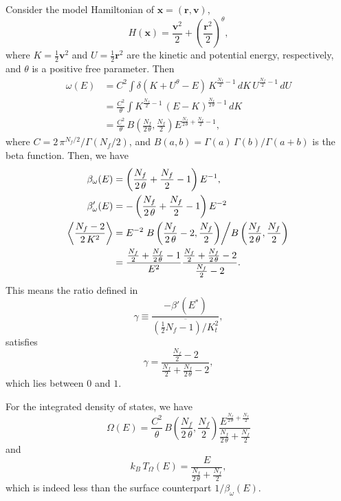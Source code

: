 \documentclass[preprint]{revtex4-1}
\begin{document}
%
Consider the model Hamiltonian of $\mathbf x = (\mathbf r, \mathbf v)$,
\begin{equation}
  H(\mathbf x)
  =
  \frac{\mathbf v^2} { 2 }
  +
  \left( \frac{\mathbf r^2} { 2 } \right)^\theta
  ,
\end{equation}
%
where $K = \frac 1 2 {\mathbf v}^2$ and
$U = \frac 1 2 {\mathbf r}^2$
are the kinetic and potential energy, respectively,
and $\theta$ is a positive free parameter.
Then
\begin{align*}
  \omega(E)
  &=
  C^2
  \int
    \delta\left( K + U^\theta - E \right) \,
    K^{\frac{ N_f } 2 - 1} \, dK \, U^{\frac{ N_f } 2 - 1} \, dU
  \\
  &=
  \frac{ C^2 } { \theta }
  \int
  K^{\frac{ N_f } 2 - 1} \, (E - K)^{\frac{ N_f }{ 2 \, \theta } - 1}
    \, dK
  \\
  &=
  \frac{ C^2 }{ \theta } \,
  B\left( \frac{ N_f } {2 \, \theta}, \frac{ N_f } 2 \right)
  E^{ \frac{ N_f }{2 \, \theta} + \frac{N_f}{2} - 1 }
  ,
\end{align*}
where
%
$C = 2 \, \pi^{N_f/2} / \Gamma\left( N_f / 2 \right)$,
and
$B(a, b) = \Gamma(a) \, \Gamma(b) / \Gamma(a+b)$
is the beta function.
%
Then, we have
\begin{align*}
\beta_\omega(E)
&=
\left(
  \frac{ N_f } { 2 \, \theta } + \frac{ N_f } 2 - 1
\right)
E^{-1}
,
\\
\beta'_\omega(E)
&=
-
\left(
  \frac{ N_f } { 2 \, \theta } + \frac{ N_f } 2 - 1
\right)
E^{-2}
\\
\left\langle
  \frac{
    N_f - 2
  }
  {
    2 \, K^2
  }
\right\rangle
&=
  E^{-2}
\left.
  B\left( \frac{ N_f } { 2  \, \theta } - 2, \frac{ N_f } { 2 } \right)
\middle/
  B\left( \frac{ N_f } { 2  \, \theta }, \frac{ N_f } { 2 } \right)
\right.
\\
&=
\frac{ \frac{ N_f } 2 + \frac{ N_f }{2 \, \theta} - 1 }
     { E^2 }
\frac{ \frac{ N_f } 2 + \frac{ N_f }{2 \, \theta} - 2 }
     { \frac{ N_f } 2 - 2 }
.
\end{align*}
This means the ratio defined in
\begin{equation}
  \gamma
  \equiv
  \frac
  {
    -\beta'(E^*)
  }
  {
    \overline{
      \left( \frac 1 2 N_f - 1  \right) / K_t^2
    }
  }
  ,
  \label{eq:gamma_def}
\end{equation}
satisfies
$$
\gamma
=
\frac
{
  \frac{ N_f } 2 - 2
}
{
  \frac{ N_f } 2 + \frac{N_f}{2 \, \theta} - 2
}
,
$$
which lies between $0$ and $1$.


For the integrated density of states, we have
$$
\Omega(E)
  =
  \frac{ C^2 }{ \theta } \,
  B\left( \frac{ N_f } {2 \, \theta}, \frac{ N_f } 2 \right)
  \frac{ E^{ \frac{ N_f }{2 \, \theta} + \frac{N_f}{2}  } }
  { \frac{ N_f } { 2 \, \theta } + \frac{ N_f } { 2 } }
$$
and
$$
k_B \, T_\Omega(E)
=
\frac{ E }
  { \frac{ N_f } { 2 \, \theta } + \frac{ N_f } { 2 } }
,
$$
which is indeed less than the surface counterpart $1/\beta_\omega(E)$.

%

\end{document}
